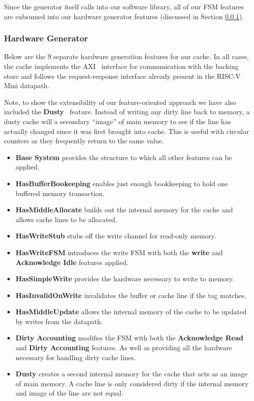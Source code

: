 \documentclass[conference]{IEEEtran}
\begin{document}
Since the generator itself calls into our software library, all of our FSM features are subsumed into our hardware generator features (discussed in Section \ref{sec:hwFeatures}). 

\subsubsection{Hardware Generator}\label{sec:hwFeatures}
Below are the 9 separate hardware generation features for our cache. In all cases, the cache implements the AXI~\cite{AXI} interface for communication with the backing store and follows the request-response interface already present in the RISC-V Mini datapath.

Note, to show the extensibility of our feature-oriented approach we have also included the \textbf{Dusty}~\cite{Krishna:06, Friedman:05} feature. Instead of writing any dirty line back to memory, a dusty cache will a secondary ``image'' of main memory to see if the line has actually changed since it was first brought into cache. This is useful with circular counters as they frequently return to the same value.

\begin{itemize}
    \item \textbf{Base System} provides the structure to which all other features can be applied.
    \item \textbf{HasBufferBookeeping} enables just enough bookkeeping to hold one buffered memory transaction.
    \item \textbf{HasMiddleAllocate} builds out the internal memory for the cache and allows cache lines to be allocated.
    \item \textbf{HasWriteStub} stubs off the write channel for read-only memory.
    \item \textbf{HasWriteFSM} introduces the write FSM with both the \textbf{write} and \textbf{Acknowledge Idle} features applied.
    \item \textbf{HasSimpleWrite} provides the hardware necessary to write to memory.
    \item \textbf{HasInvalidOnWrite} invalidates the buffer or cache line if the tag matches.
    \item \textbf{HasMiddleUpdate} allows the internal memory of the cache to be updated by writes from the datapath.
    \item \textbf{Dirty Accounting} modifies the FSM with both the \textbf{Acknowledge Read} and \textbf{Dirty Accounting} features. As well as providing all the hardware necessary for handling dirty cache lines.
    \item \textbf{Dusty} creates a second internal memory for the cache that acts as an image of main memory. A cache line is only considered dirty if the internal memory and image of the line are not equal.
\end{itemize}
\end{document}
